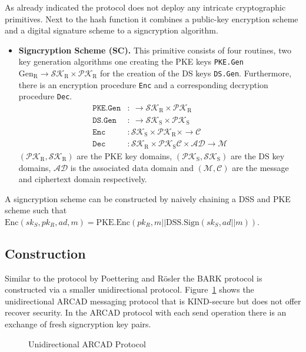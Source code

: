 \documentclass[11pt,a4paper,twoside,openright,bibliography=totoc]{scrbook}
\renewcommand{\t}{\text} %
\begin{document}
As already indicated the protocol does not deploy any intricate
cryptographic primitives. Next to the hash function it combines a
public-key encryption scheme and a digital signature scheme to
a signcryption algorithm.
\begin{itemize}
\item \textbf{Signcryption Scheme (SC).} This primitive consists of four routines,
  two key generation algorithms one creating the PKE keys \texttt{PKE.Gen}
  $\t{Gen}_\t{R} \rightarrow \mathcal{SK}_\t{R} \times \mathcal{PK}_\t{R}$
  for the creation of the DS keys \texttt{DS.Gen}. Furthermore,
  there is an encryption procedure \texttt{Enc} and a corresponding
  decryption procedure \texttt{Dec}.
  \begin{align*}
    \texttt{PKE.Gen} & : \ \rightarrow \mathcal{SK}_\t{R} \times \mathcal{PK}_\t{R} \\
    \texttt{DS.Gen} & : \ \rightarrow \mathcal{SK}_\t{S} \times \mathcal{PK}_\t{S} \\
    \texttt{Enc} & : \mathcal{SK}_\t{S} \times \mathcal{PK}_\t{R} \times
                   \rightarrow \mathcal{C} \\
    \texttt{Dec} & : \mathcal{SK}_\t{R} \times \mathcal{PK}_\t{S}
  \mathcal{C} \times \mathcal{AD} \rightarrow \mathcal{M}
  \end{align*}
  $(\mathcal{PK}_\t{R},\mathcal{SK}_\t{R})$ are the PKE key domains,
  $(\mathcal{PK}_\t{S},\mathcal{SK}_\t{S})$ are the DS key domains, $\mathcal{AD}$
  is the associated data domain and $(\mathcal{M}, \mathcal{C})$ are
  the message and ciphertext domain respectively.
\end{itemize}

A signcryption scheme can be constructed by naively chaining a DSS and PKE scheme
such that $\t{Enc}(sk_S,pk_R,ad,m) = \t{PKE.Enc}(pk_R,m || \t{DSS.Sign}(sk_S,ad || m))$.

\subsection{Construction}
\label{sec:construction-2}

Similar to the protocol by Poettering and Rösler the BARK protocol is
constructed via a smaller unidirectional protocol. Figure~\ref{fig:uni-arcad}
shows the unidirectional ARCAD messaging protocol that is KIND-secure but
does not offer recover security. In the ARCAD protocol with each send operation
there is an exchange of fresh signcryption key pairs.

\begin{figure}[H]
  \centering
  \setlength{\fboxsep}{10pt}
  \scalebox{0.9}{%
    \fbox{%
      
    }
  }
  \caption{Unidirectional ARCAD Protocol}
  \label{fig:uni-arcad}
\end{figure}
\end{document}
